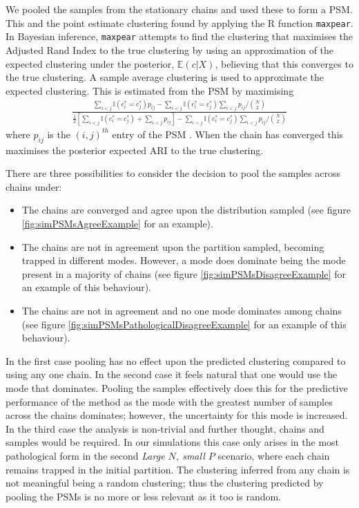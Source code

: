 \documentclass[]{article}
\begin{document}
We pooled the samples from the stationary chains and used these to form a PSM. This and the point estimate clustering found by applying the R function \texttt{maxpear}. In Bayesian inference, \texttt{maxpear} attempts to find the clustering that maximises the Adjusted Rand Index to the true clustering by using an approximation of the expected clustering under the posterior, $\mathbb{E}(c|X)$, believing that this converges to the true clustering. A sample average clustering is used to approximate the expected clustering. This is estimated from the PSM by maximising
\begin{align}
	\frac{\sum_{i < j}\mathbb{I}(c_i^* = c_j^*) p_{ij} - \sum_{i < j}\mathbb{I}(c_i^* = c_j^*)\sum_{i < j}p_{ij} / {N \choose 2}}{\frac{1}{2}\left[\sum_{i < j}\mathbb{I}(c_i^* = c_j^*) + \sum_{i < j}p_{ij}\right] - \sum_{i < j}\mathbb{I}(c_i^* = c_j^*)\sum_{i < j}p_{ij} / {N \choose 2}}
\end{align}
where $p_{ij}$ is the $(i,j)^{th}$ entry of the PSM \citep{fritsch2009improved}. When the chain has converged this maximises the posterior expected ARI to the true clustering.

There are three possibilities to consider the decision to pool the samples across chains under:
\begin{itemize}
	\item The chains are converged and agree upon the distribution sampled (see figure \ref{fig:simPSMsAgreeExample} for an example).
	\item The chains are not in agreement upon the partition sampled, becoming trapped in different modes. However, a mode does dominate being the mode present in a majority of chains (see figure \ref{fig:simPSMsDisagreeExample} for an example of this behaviour).
	\item The chains are not in agreement and no one mode dominates among chains (see figure \ref{fig:simPSMsPathologicalDisagreeExample} for an example of this behaviour).
\end{itemize}
In the first case pooling has no effect upon the predicted clustering compared to using any one chain. In the second case it feels natural that one would use the mode that dominates. Pooling the samples effectively does this for the predictive performance of the method as the mode with the greatest number of samples across the chains dominates; however, the uncertainty for this mode is increased. In the third case the analysis is non-trivial and further thought, chains and samples would be required. In our simulations this case only arises in the most pathological form in the second \emph{Large $N$, small $P$} scenario, where each chain remains trapped in the initial partition. The clustering inferred from any chain is not meaningful being a random clustering; thus the clustering predicted by pooling the PSMs is no more or less relevant as it too is random. 
\end{document}
